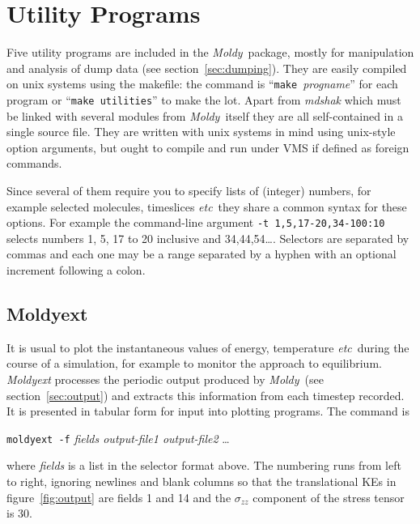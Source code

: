 \documentclass[twoside]{report}
\newcommand{\moldy}{{\em Moldy}}
\newcommand{\etc}{{\em etc}}
\begin{document}
\chapter{Utility Programs} %
Five utility programs are included in the \moldy\ package, mostly for
manipulation and analysis of dump data (see section~\ref{sec:dumping}).
They are easily compiled on unix systems using the makefile: the
command is ``\texttt{make}~{\em progname\/}'' for each program or
``\texttt{make utilities}'' to make the lot.  Apart from {\em mdshak\/}
which must be linked with several modules from \moldy\ itself they are
all self-contained in a single source file.  They are written with
unix systems in mind using unix-style option arguments, but ought to
compile and run under VMS if defined as foreign commands.

Since several of them require you to specify lists of (integer)
numbers, for example selected molecules, timeslices \etc\ they share a
common syntax for these options.  For example the command-line
argument \mbox{\texttt{-t 1,5,17-20,34-100:10}} selects numbers 1, 5, 17 to 20
inclusive and 34,44,54\ldots.  Selectors are separated by commas and
each one may be a range separated by a hyphen with an optional
increment following a colon.

\section{Moldyext}%
It is usual to plot the instantaneous values of energy, temperature
\etc\ during the course of a simulation, for example to monitor the
approach to equilibrium.  {\em Moldyext\/} processes the periodic
output produced by \moldy\ (see section~\ref{sec:output}) and extracts
this information from each timestep recorded.  It is presented in
tabular form for input into plotting programs.  The command is
\begin{center}
\texttt{moldyext -f} {\em fields output-file1 output-file2} \ldots
\end{center}
where {\em fields\/} is a list in the selector format above.  The
numbering runs from left to right, ignoring newlines and blank columns
so that the translational KEs in figure~\ref{fig:output} are fields 1
and 14 and the $\sigma_{zz}$ component of the stress tensor is 30.
\end{document}
